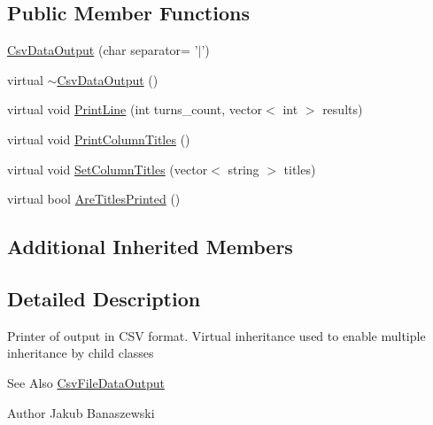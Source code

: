 \subsection*{Public Member Functions}
\begin{DoxyCompactItemize}
\item 
\hyperlink{classBase_1_1CsvDataOutput_acbedd47083f64caaafc2a33336bef869}{Csv\-Data\-Output} (char separator= '$\vert$')
\item 
virtual \hyperlink{classBase_1_1CsvDataOutput_ac1fbaa916fb293fea40e772397450b5f}{$\sim$\-Csv\-Data\-Output} ()
\item 
virtual void \hyperlink{classBase_1_1CsvDataOutput_a88994527237735d1d6a05cec3b222ba7}{Print\-Line} (int turns\-\_\-count, vector$<$ int $>$ results)
\item 
virtual void \hyperlink{classBase_1_1CsvDataOutput_aa54484865cd138cf49b5aa5b9ef813d5}{Print\-Column\-Titles} ()
\item 
virtual void \hyperlink{classBase_1_1CsvDataOutput_a9302a89524b164d440280bc1c90c90d3}{Set\-Column\-Titles} (vector$<$ string $>$ titles)
\item 
virtual bool \hyperlink{classBase_1_1CsvDataOutput_aaa4e604ce1d06ee002889b2604faf4e4}{Are\-Titles\-Printed} ()
\end{DoxyCompactItemize}
\subsection*{Additional Inherited Members}


\subsection{Detailed Description}
Printer of output in C\-S\-V format. Virtual inheritance used to enable multiple inheritance by child classes \begin{DoxySeeAlso}{See Also}
\hyperlink{classBase_1_1CsvFileDataOutput}{Csv\-File\-Data\-Output} 
\end{DoxySeeAlso}
\begin{DoxyAuthor}{Author}
Jakub Banaszewski 
\end{DoxyAuthor}


